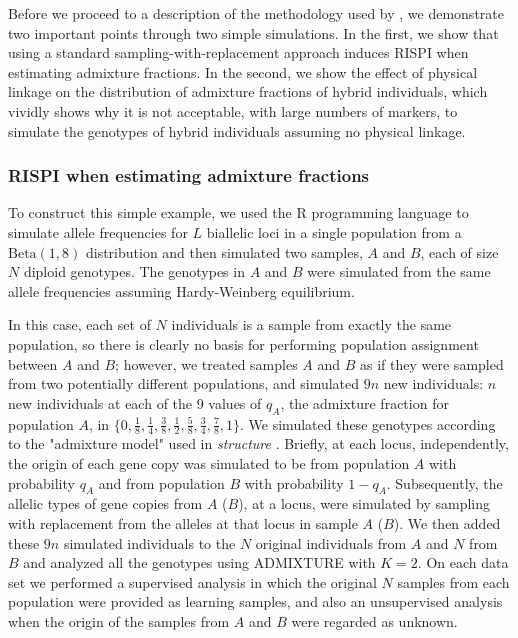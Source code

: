 Before we proceed to a description of the methodology used by \gscramble{},
we demonstrate two important points through two simple simulations.  In the first,
we show that using a standard sampling-with-replacement
approach induces RISPI when estimating admixture fractions. In the second, we show
the effect of physical linkage on the distribution of admixture fractions of hybrid individuals,
which vividly shows why it is not acceptable, with large numbers of markers, to simulate
the genotypes of hybrid individuals assuming no physical linkage.


\subsubsection*{RISPI when estimating admixture fractions}
\label{sec:rispi-sim}

To construct this simple example, we used the R programming language \citep{Rcoreteam} to
simulate allele frequencies for $L$ biallelic
loci in a single population from a $\mathrm{Beta}(1, 8)$ distribution and then simulated
two samples, $A$ and $B$, each of size $N$ diploid genotypes. The genotypes in $A$ and $B$ were simulated
from the same allele frequencies assuming Hardy-Weinberg equilibrium.

In this case,
each set of $N$ individuals is a sample from exactly the same population, so
there is clearly no basis for performing population assignment between $A$ and $B$;
however, we treated samples $A$ and $B$ as if they were sampled from two potentially different
populations, and simulated $9n$ new individuals: $n$ new individuals at each of the 9 values of
$q_A$, the admixture fraction for population $A$, in  $\{0, \frac{1}{8}, \frac{1}{4}, \frac{3}{8}, \frac{1}{2}, \frac{5}{8}, \frac{3}{4}, \frac{7}{8}, 1\}$.
We simulated these genotypes according to the "admixture model" used in {\em structure} \citep{pritchard2000inference}.  Briefly, at each
locus, independently, the origin
of each gene copy was simulated to be from
population $A$ with probability $q_A$ and from population $B$ with probability $1-q_A$.  Subsequently,
the allelic types of gene copies from $A$ ($B$), at a locus, were simulated by sampling with replacement
from the alleles at that locus in sample $A$ ($B$).
We then added these $9n$ simulated individuals to the $N$ original individuals  from $A$ and $N$ from $B$
and analyzed all the genotypes using ADMIXTURE with $K=2$. On each data set we performed a supervised analysis in which the original
$N$ samples from each
population were provided as learning samples, and also an
unsupervised analysis when the origin of the samples from $A$ and $B$ were regarded as unknown.


